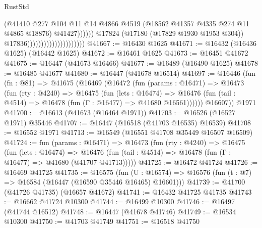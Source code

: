 \begin{lexlean}{RustStd}
\begin{coremodule}
{\begin{coremodule}
{{{{{{{{{{{{{{{{{{{{{{{{{{{{{{{{{{{{{{{{{{{{{{{{{{{{{{{                                                        (@41410
                                                          @277
                                                          @104
                                                          @11
                                                          @14
                                                          @4866
                                                          @4519
                                                          (@18562
                                                            @41357
                                                            @4335
                                                            @274
                                                            @11
                                                            @4865
                                                            @18876)
                                                          @41427))))))
                                              @17824
                                              (@17180 (@17829 @1930 @1953 @304))
                                              @17836)))))))))))))))))))))
@41667 := @16430 @1625
@41671 := @16432 (@16436 @1625) (@16442 @1625)
@41672 := @16461 @1625
@41673 := @16451 @41672
@41675 := @16447 (@41673 @16466)
@41677 := @16489 (@16490 @1625)
@41678 := @16485 @41677
@41680 := @16447 (@41678 @16514)
@41697 := @16446
    (fun (fn : @81) =>
    @41675
      (@16469
        (@16472
          (fun (params : @16471) =>
          @16473
            (fun (rty : @4240) =>
            @16475
              (fun (lets : @16474) =>
              @16476 (fun (tail : @4514) => @16478 (fun (Γ : @16477) => @41680 @16561))))))
        @16607))
    @1971
@41700 := @16613 (@41673 (@16464 @1971))
@41703 := @16526 (@16527 @1971) @35446
@41707 := @16447 (@16518 (@41703 @16535) @16539)
@41708 := @16552 @1971
@41713 := @16549 (@16551 @41708 @35449 @16507 @16509)
@41724 := fun (params : @16471) =>
  @16473
    (fun (rty : @4240) =>
    @16475
      (fun (lets : @16474) =>
      @16476 (fun (tail : @4514) => @16478 (fun (Γ : @16477) => @41680 (@41707 @41713)))))
@41725 := @16472 @41724
@41726 := @16469 @41725
@41735 := @16575
    (fun (U : @16574) => @16576 (fun (t : @7) => @16584 (@16447 (@16590 @35446 @16465) @16601)))
@41739 := @41700 (@41726 @41735) (@16657 @41672)
@41741 := @16432 @41725 @41735
@41743 := @16662 @41724 @10300
@41744 := @16499 @10300
@41746 := @16497 (@41744 @16512)
@41748 := @16447 (@41678 @41746)
@41749 := @16534 @10300
@41750 := @41703 @41749
@41751 := @16518 @41750
}}}}}}}}}}}}}}}}}}}}}}}}}}}}}}}}}}}}}}}}}}}}}}}}}}}}}}}
\end{coremodule}}
\end{coremodule}
\end{lexlean}
